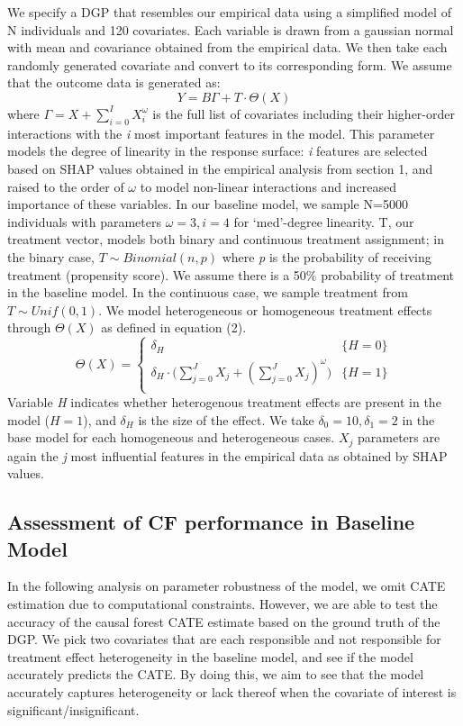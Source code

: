 \documentclass[12pt]{article}
\begin{document}
We specify a DGP that resembles our empirical data using a simplified model of N individuals and 120 covariates. Each variable is drawn from a gaussian normal with mean and covariance obtained from the empirical data. We then take each randomly generated covariate and convert to its corresponding form. We assume that the outcome data is generated as: 
\[ Y = B \Gamma + T  \cdot \Theta(X) \tag{1} \label{eq:special}\]
where $\Gamma = X + \sum_{i = 0}^{I} X_i^\omega$ is the full list of covariates including their higher-order interactions with the \textit{i} most important features in the model. This parameter models the degree of linearity in the response surface: \textit{i} features are selected based on SHAP values obtained in the empirical analysis from section 1, and raised to the order of $\omega$ to model non-linear interactions and increased importance of these variables. In our baseline model, we sample N=5000 individuals with parameters $\omega = 3, i = 4$ for `med'-degree linearity. T, our treatment vector, models both binary and continuous treatment assignment; in the binary case, $ T \sim Binomial(n,p)$ where \textit{p} is the probability of receiving treatment (propensity score). We assume there is a 50\% probability of treatment in the baseline model. In the continuous case, we sample treatment from $T \sim Unif(0,1)$. We model heterogeneous or homogeneous treatment effects through $\Theta(X)$ as defined in equation (2). 
\[
\Theta(X) =  \begin{cases} 
	 \delta_H & {\{H = 0\}} \\ 
	 \delta_H \cdot \big( \sum_{j = 0}^{J} X_j + (\sum_{j = 0}^{J} X_j )^\omega ) & \{ H = 1 \} \\ 
\end{cases} \tag{2} \label{eq:special} \]
Variable \textit{H} indicates whether heterogenous treatment effects are present in the model ($H = 1$), and $\delta_H$ is the size of the effect. We take $\delta_0 = 10, \delta_1 = 2$ in the base model for each homogeneous and heterogeneous cases. $X_j$ parameters are again the \textit{j} most influential features in the empirical data as obtained by SHAP values. \\

\subsection{Assessment of CF performance in Baseline Model} 
In the following analysis on parameter robustness of the model, we omit CATE estimation due to computational constraints. However, we are able to test the accuracy of the causal forest CATE estimate based on the ground truth of the DGP. We pick two covariates that are each responsible and not responsible for treatment effect heterogeneity in the baseline model, and see if the model accurately predicts the CATE. By doing this, we aim to see that the model accurately captures heterogeneity or lack thereof when the covariate of interest is significant/insignificant. \\
\end{document}
